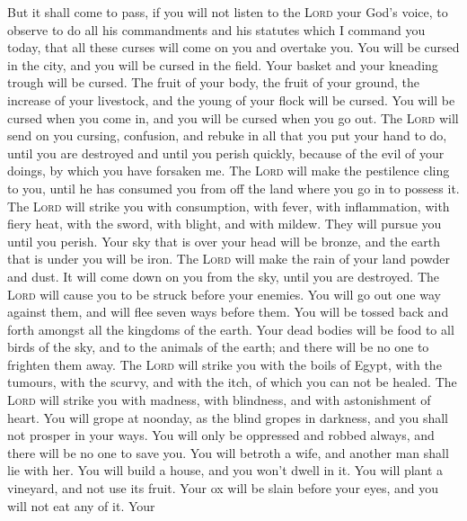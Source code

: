  But it shall come to pass, if you will not listen to the
\textsc{Lord} your God's voice, to observe to do all his commandments
and his statutes which I command you today, that all these curses will
come on you and overtake you.  You will be cursed in the
city, and you will be cursed in the field.  Your basket
and your kneading trough will be cursed.  The fruit of
your body, the fruit of your ground, the increase of your livestock, and
the young of your flock will be cursed.  You will be
cursed when you come in, and you will be cursed when you go out.
 The \textsc{Lord} will send on you cursing, confusion,
and rebuke in all that you put your hand to do, until you are destroyed
and until you perish quickly, because of the evil of your doings, by
which you have forsaken me.  The \textsc{Lord} will make
the pestilence cling to you, until he has consumed you from off the land
where you go in to possess it.  The \textsc{Lord} will
strike you with consumption, with fever, with inflammation, with fiery
heat, with the sword, with blight, and with mildew. They will pursue you
until you perish.  Your sky that is over your head will
be bronze, and the earth that is under you will be iron. 
The \textsc{Lord} will make the rain of your land powder and dust. It
will come down on you from the sky, until you are destroyed.
 The \textsc{Lord} will cause you to be struck before
your enemies. You will go out one way against them, and will flee seven
ways before them. You will be tossed back and forth amongst all the
kingdoms of the earth.  Your dead bodies will be food to
all birds of the sky, and to the animals of the earth; and there will be
no one to frighten them away.  The \textsc{Lord} will
strike you with the boils of Egypt, with the tumours, with the scurvy,
and with the itch, of which you can not be healed.  The
\textsc{Lord} will strike you with madness, with blindness, and with
astonishment of heart.  You will grope at noonday, as the
blind gropes in darkness, and you shall not prosper in your ways. You
will only be oppressed and robbed always, and there will be no one to
save you.  You will betroth a wife, and another man shall
lie with her. You will build a house, and you won't dwell in it. You
will plant a vineyard, and not use its fruit.  Your ox
will be slain before your eyes, and you will not eat any of it. Your
